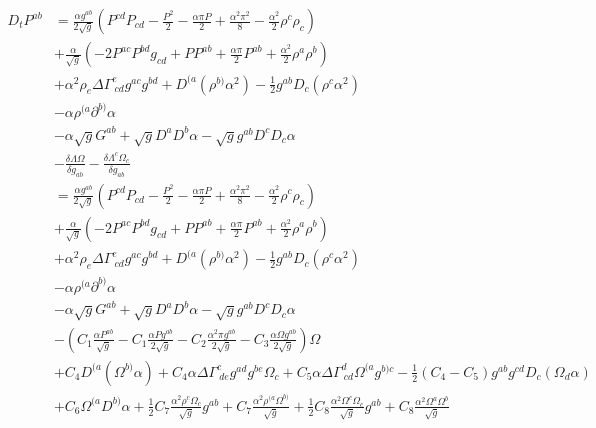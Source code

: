\documentclass{article}
\begin{document}
\begin{align*}
D_{t}P^{ab} & = \frac{\alpha g^{ab}}{2\sqrt{g}}\left(P^{cd}P_{cd} - \frac{P^{2}}{2} - \frac{\alpha \pi P}{2} + \frac{\alpha^{2}\pi^{2}}{8} - \frac{\alpha^{2}}{2}\rho^{c}\rho_{c}\right)\\
& + \frac{\alpha}{\sqrt{g}}\left(-2P^{ac}P^{bd}g_{cd} + PP^{ab} + \frac{\alpha \pi}{2}P^{ab} + \frac{\alpha^{2}}{2}\rho^{a}\rho^{b}\right)\\
& + \alpha^{2}\rho_{e}\Delta \Gamma^{e}_{~cd}g^{ac}g^{bd} + D^{(a}\left(\rho^{b)}\alpha^{2}\right) - \frac{1}{2}g^{ab}D_{c}\left(\rho^{c}\alpha^{2}\right)\\
& - \alpha \rho^{(a}\partial^{b)}\alpha\\
& - \alpha \sqrt{g}G^{ab} + \sqrt{g}D^{a}D^{b}\alpha - \sqrt{g}g^{ab}D^{c}D_{c}\alpha\\
& - \frac{\delta \Lambda \Omega}{\delta g_{ab}} - \frac{\delta \Lambda^{c}\Omega_{c}}{\delta g_{ab}}\\
& = \frac{\alpha g^{ab}}{2\sqrt{g}}\left(P^{cd}P_{cd} - \frac{P^{2}}{2} - \frac{\alpha \pi P}{2} + \frac{\alpha^{2}\pi^{2}}{8} - \frac{\alpha^{2}}{2}\rho^{c}\rho_{c}\right)\\
& + \frac{\alpha}{\sqrt{g}}\left(-2P^{ac}P^{bd}g_{cd} + PP^{ab} + \frac{\alpha \pi}{2}P^{ab} + \frac{\alpha^{2}}{2}\rho^{a}\rho^{b}\right)\\
& + \alpha^{2}\rho_{e}\Delta \Gamma^{e}_{~cd}g^{ac}g^{bd} + D^{(a}\left(\rho^{b)}\alpha^{2}\right) - \frac{1}{2}g^{ab}D_{c}\left(\rho^{c}\alpha^{2}\right)\\
& - \alpha \rho^{(a}\partial^{b)}\alpha\\
& - \alpha \sqrt{g}G^{ab} + \sqrt{g}D^{a}D^{b}\alpha - \sqrt{g}g^{ab}D^{c}D_{c}\alpha\\
& - \left(C_{1}\frac{\alpha P^{ab}}{\sqrt{g}} - C_{1}\frac{\alpha P g^{ab}}{2\sqrt{g}} - C_{2}\frac{\alpha^{2} \pi g^{ab}}{2\sqrt{g}} - C_{3}\frac{\alpha \Omega g^{ab}}{2\sqrt{g}}\right)\Omega\\
&  + C_{4}D^{(a}\left(\Omega^{b)}\alpha\right) + C_{4}\alpha \Delta \Gamma^{c}_{~de}g^{ad}g^{be}\Omega_{c} + C_{5}\alpha \Delta \Gamma^{d}_{~cd}\Omega^{(a}g^{b)c} - \frac{1}{2}\left(C_{4} - C_{5}\right)g^{ab}g^{cd}D_{c}\left(\Omega_{d}\alpha\right)\\
& + C_{6} \Omega^{(a}D^{b)}\alpha + \frac{1}{2}C_{7} \frac{\alpha^{2}\rho^{c}\Omega_{c}}{\sqrt{g}}g^{ab} + C_{7}\frac{\alpha^{2}\rho^{(a}\Omega^{b)}}{\sqrt{g}} + \frac{1}{2}C_{8}\frac{\alpha^{2}\Omega^{c}\Omega_{c}}{\sqrt{g}}g^{ab} + C_{8}\frac{\alpha^{2}\Omega^{a}\Omega^{b}}{\sqrt{g}}
\end{align*}
\end{document}
